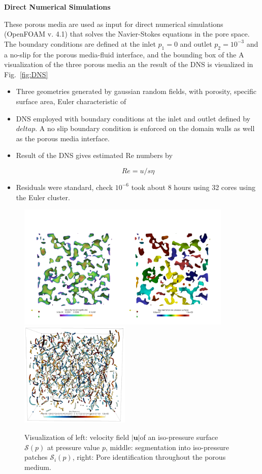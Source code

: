 \documentclass[draft,jgrga]{agutexSI2019}
\begin{document}
\begin{article}
\noindent\textbf{Direct Numerical Simulations}

These porous media are used as input for direct numerical simulations (OpenFOAM v. 4.1)   that solves the Navier-Stokes equations in the pore space. The boundary conditions are defined at the inlet $p_1 = 0$ and outlet $p_2 = 10^{-3}$ and a no-slip for the porous media-fluid interface, and the bounding box of the  A visualization of the three porous media an the result of the DNS is visualized in Fig.~\ref{fig:DNS}
\begin{itemize}
	\item Three geometries generated by gaussian random fields, with porosity, specific surface area, Euler characteristic of 
	\item DNS employed with boundary conditions at the inlet and outlet defined by $delta p$. A no slip boundary condition is enforced on the domain walls as well as the porous media interface. 
	\item Result of the DNS gives estimated Re numbers by 

	\begin{equation}
		Re = u/s\eta
	\end{equation}

	\item Residuals were standard, check $10^{-6}$ took about 8 hours using 32 cores using the Euler cluster. 


\end{itemize}

\begin{figure}[htbp!]\label{fig:segmentation}
\includegraphics[height=6cm]{figures/semgentation_veloctiy_iso_p_surface.png}
\includegraphics[height=5cm]{figures/pores_PM2.png}
\caption{Visualization of left: velocity field $|\mathbf{u}|$of an iso-pressure surface $\mathcal{S}(p)$ at pressure value $p$, middle: segmentation into iso-pressure patches  $\mathcal{S}_i(p)$, right: Pore identification throughout the porous medium. }
\end{figure}


\end{article}
\end{document}
